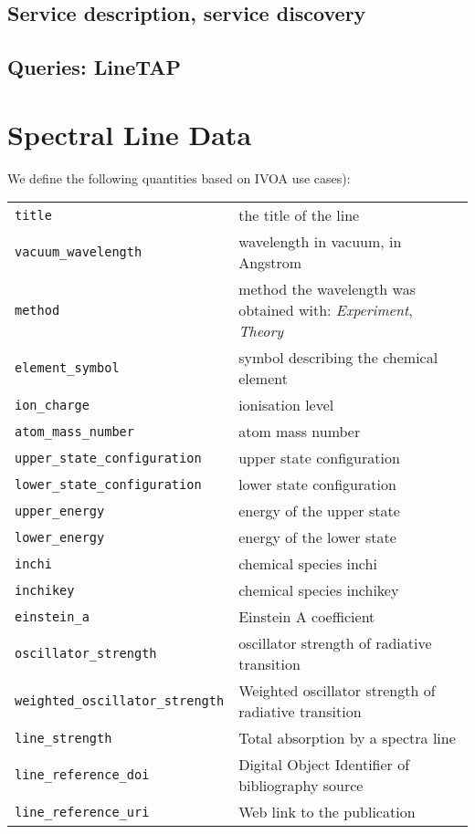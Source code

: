 \documentclass[11pt,a4paper]{ivoa}
\begin{document}
\subsection{ Service description, service discovery }

\subsection{ Queries: LineTAP }


\section{Spectral Line Data}\label{quantities}

We define the following quantities based on IVOA use cases):


\begin{table}[H]
\begin{center}
\begin{tabular}{l l}%
\texttt{title} & the title of the line \\
\texttt{vacuum\_wavelength} & wavelength in vacuum, in Angstrom \\
\texttt{method} & method the wavelength was obtained with: \textit{Experiment}, \textit{Theory}  \\
\texttt{element\_symbol} & symbol describing the chemical element \\
\texttt{ion\_charge} & ionisation level\\
\texttt{atom\_mass\_number} & atom mass number\\
\texttt{upper\_state\_configuration} & upper state configuration\\
\texttt{lower\_state\_configuration} & lower state configuration\\
\texttt{upper\_energy} & energy of the upper state \\
\texttt{lower\_energy} & energy of the lower state\\
\texttt{inchi} & chemical species inchi \\
\texttt{inchikey} & chemical species inchikey \\
\texttt{einstein\_a} & Einstein A coefficient\\
\texttt{oscillator\_strength} & oscillator strength of radiative transition \\
\texttt{weighted\_oscillator\_strength} &  Weighted oscillator strength of radiative transition \\
\texttt{line\_strength} & Total absorption by a spectra line \\
\texttt{line\_reference\_doi} & Digital Object Identifier of bibliography source \\
\texttt{line\_reference\_uri} & Web link to the publication\\
\end{tabular}

\end{center}
\end{table}
\end{document}
